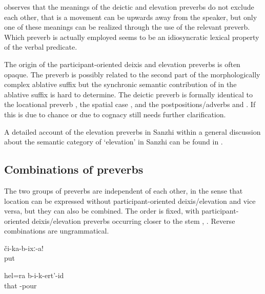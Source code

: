 \citet{Tatevosov2000} observes that the meanings of the deictic and elevation preverbs do not exclude each other, that is a movement can be upwards away from the speaker, but only one of these meanings can be realized through the use of the relevant preverb. Which preverb is actually employed seems to be an idiosyncratic lexical property of the verbal predicate.

The origin of the participant-oriented deixis and elevation preverbs is often opaque. The preverb  is possibly related to the second part of the morphologically complex ablative suffix  but the synchronic semantic contribution of  in the ablative suffix is hard to determine. The deictic preverb   is formally identical to the locational preverb  , the spatial case  , and the postpositions/adverbs   and  . If this is due to chance or due to cognacy still needs further clarification.

A detailed account of the elevation preverbs in Sanzhi within a general discussion about the semantic category of `elevation' in Sanzhi can be found in \citet{ForkerLTSanzhi}.


\subsection{Combinations of preverbs}
\label{ssec:Combinations of preverbs}

The two groups of preverbs are independent of each other, in the sense that location can be expressed without participant-oriented deixis/elevation and vice versa, but they can also be combined. The order is fixed, with participant-oriented deixis/elevation preverbs occurring closer to the stem , . Reverse combinations are ungrammatical.
%
\begin{exe}
	\ex	\label{ex:Put (it) down verbs}
	\gll	či-ka-b-ixː-a!\\
		put\\
	\glt	{}

	\ex	\label{ex:I pour this in as well verbs}
	\gll	hel=ra	b-i-k-ert'-id\\
		that	-pour\\
	\glt	{}
\end{exe}

